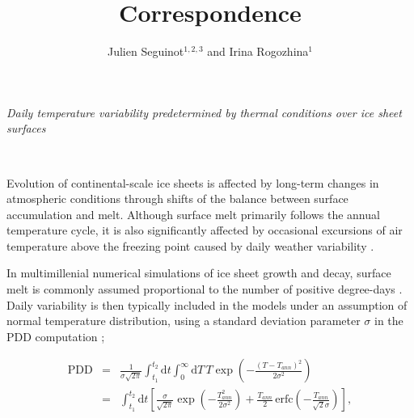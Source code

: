 \documentclass[review]{igs}
\begin{document}
\title[Correspondence]{Correspondence}
\author[Seguinot and Rogozhina]{Julien Seguinot$^{1,2,3}$ and Irina Rogozhina$^1$}

\maketitle


\emph{Daily temperature variability predetermined by thermal conditions over ice sheet surfaces}

~

Evolution of continental-scale ice sheets is affected by long-term changes in atmospheric conditions through shifts of the balance between surface accumulation and melt. Although surface melt primarily follows the annual temperature cycle, it is also significantly affected by occasional excursions of air temperature above the freezing point caused by daily weather variability \citep{arnold-mackay-1964}.

In multimillenial numerical simulations of ice sheet growth and decay, surface melt is commonly assumed proportional to the number of positive degree-days \citep[PDD;][]{hock-2003}. Daily variability is then typically included in the models under an assumption of normal temperature distribution, using a standard deviation parameter $\sigma$ in the PDD computation \citep{braithwaite-1984,reeh-1991,calov-greve-2005};

\begin{eqnarray} \label{eq:pdd}
    \mathrm{PDD} &=& \frac{1}{\sigma\sqrt{2\pi}}
        \int_{t_1}^{t_2} \mathrm{d}t
        \int_{0}^{\infty} \mathrm{d}T \,
        T \exp\left({-\frac{(T-T_{ann})^2}{2\sigma^2}}\right)\\
    &=& \int_{t_1}^{t_2} \mathrm{d}t
        \left[\frac{\sigma}{\sqrt{2\pi}} \exp\left({-\frac{T_{ann}^2}{2\sigma^2}}\right)
        + \frac{T_{ann}}{2} \, \mathrm{erfc} \left(-\frac{T_{ann}}{\sqrt{2}\sigma}\right)\right],
\end{eqnarray}
\end{document}
